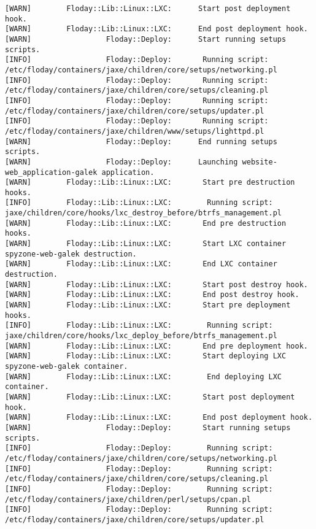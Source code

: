 \begin{lstlisting}[caption={config.yml}, label=fig_1.4_floday, basicstyle=\tiny, xleftmargin=-3cm]
[WARN]        Floday::Lib::Linux::LXC:      Start post deployment hook.
[WARN]        Floday::Lib::Linux::LXC:      End post deployment hook.
[WARN]                 Floday::Deploy:      Start running setups scripts.
[INFO]                 Floday::Deploy:       Running script: /etc/floday/containers/jaxe/children/core/setups/networking.pl
[INFO]                 Floday::Deploy:       Running script: /etc/floday/containers/jaxe/children/core/setups/cleaning.pl
[INFO]                 Floday::Deploy:       Running script: /etc/floday/containers/jaxe/children/core/setups/updater.pl
[INFO]                 Floday::Deploy:       Running script: /etc/floday/containers/jaxe/children/www/setups/lighttpd.pl
[WARN]                 Floday::Deploy:      End running setups scripts.
[WARN]                 Floday::Deploy:      Launching website-web_application-galek application.
[WARN]        Floday::Lib::Linux::LXC:       Start pre destruction hooks.
[INFO]        Floday::Lib::Linux::LXC:        Running script: jaxe/children/core/hooks/lxc_destroy_before/btrfs_management.pl
[WARN]        Floday::Lib::Linux::LXC:       End pre destruction hooks.
[WARN]        Floday::Lib::Linux::LXC:       Start LXC container spyzone-web-galek destruction.
[WARN]        Floday::Lib::Linux::LXC:       End LXC container destruction.
[WARN]        Floday::Lib::Linux::LXC:       Start post destroy hook.
[WARN]        Floday::Lib::Linux::LXC:       End post destroy hook.
[WARN]        Floday::Lib::Linux::LXC:       Start pre deployment hooks.
[INFO]        Floday::Lib::Linux::LXC:        Running script: jaxe/children/core/hooks/lxc_deploy_before/btrfs_management.pl
[WARN]        Floday::Lib::Linux::LXC:       End pre deployment hook.
[WARN]        Floday::Lib::Linux::LXC:       Start deploying LXC spyzone-web-galek container.
[WARN]        Floday::Lib::Linux::LXC:        End deploying LXC container.
[WARN]        Floday::Lib::Linux::LXC:       Start post deployment hook.
[WARN]        Floday::Lib::Linux::LXC:       End post deployment hook.
[WARN]                 Floday::Deploy:       Start running setups scripts.
[INFO]                 Floday::Deploy:        Running script: /etc/floday/containers/jaxe/children/core/setups/networking.pl
[INFO]                 Floday::Deploy:        Running script: /etc/floday/containers/jaxe/children/core/setups/cleaning.pl
[INFO]                 Floday::Deploy:        Running script: /etc/floday/containers/jaxe/children/perl/setups/cpan.pl
[INFO]                 Floday::Deploy:        Running script: /etc/floday/containers/jaxe/children/core/setups/updater.pl

\end{lstlisting}
